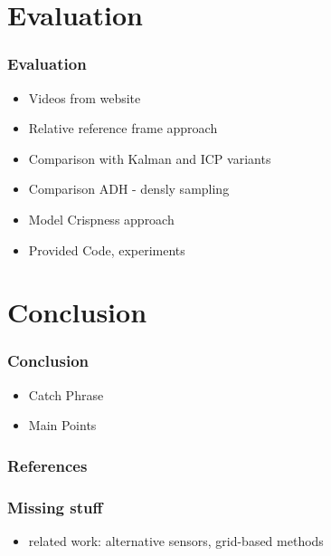 \section{Evaluation}
\begin{frame}
  \frametitle{Evaluation}
  \begin{itemize}
  \item Videos from website
  \item Relative reference frame approach
  \item Comparison with Kalman and ICP variants
  \item Comparison ADH - densly sampling
  \item Model Crispness approach
  \item Provided Code, experiments
  \end{itemize}
\end{frame}

\section{Conclusion}
\begin{frame}
  \frametitle{Conclusion}
  \begin{itemize}
  \item Catch Phrase
  \item Main Points
  \end{itemize}
\end{frame}



\backupbegin

\begin{frame}[allowframebreaks]
  \frametitle{References}
  
  
\end{frame}

\begin{frame}
  \frametitle{Missing stuff}
  \begin{itemize}
  \item related work: alternative sensors, grid-based methods
  \end{itemize}
\end{frame}

\backupend


